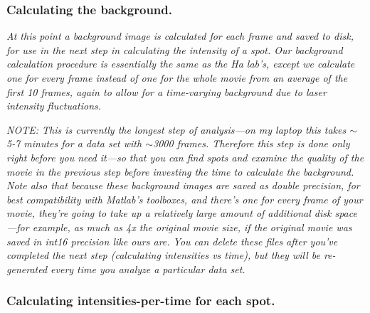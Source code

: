 \documentclass[11pt]{article}
\begin{document}
\subsubsection{Calculating the background.}\label{sec:BkgndSub}

{\it At this point a background image is calculated for each frame and saved to disk, for use in the next step in calculating the intensity of a spot.  Our background calculation procedure is essentially the same as the Ha lab's, except we calculate one for every frame instead of one for the whole movie from an average of the first 10 frames, again to allow for a time-varying background due to laser intensity fluctuations.}

{\it NOTE: This is currently the longest step of analysis---on my laptop this takes $\sim$5-7 minutes for a data set with $\sim$3000 frames.  Therefore this step is done only right before you need it---so that you can find spots and examine the quality of the movie in the previous step before investing the time to calculate the background.  Note also that because these background images are saved as double precision, for best compatibility with Matlab's toolboxes, and there's one for every frame of your movie, they're going to take up a relatively large amount of additional disk space---for example, as much as 4x the original movie size, if the original movie was saved in int16 precision like ours are.  You can delete these files after you've completed the next step (calculating intensities vs time), but they will be re-generated every time you analyze a particular data set. }

\subsubsection{Calculating intensities-per-time for each spot.}
\end{document}
